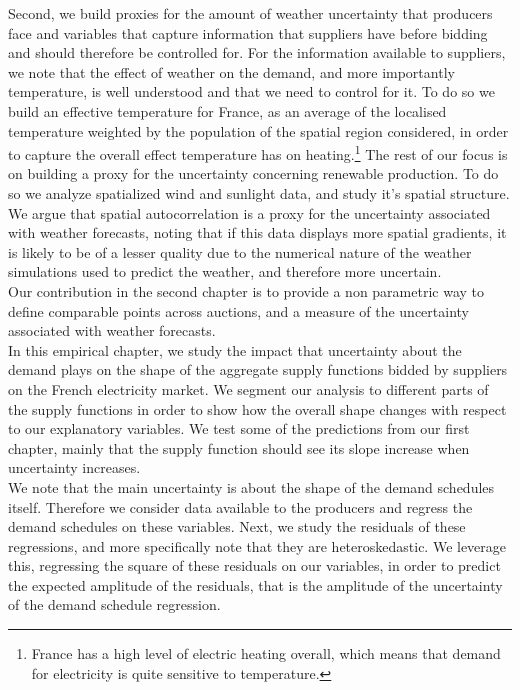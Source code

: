 Second, we build proxies for the amount of weather uncertainty that producers face and variables that capture information that suppliers have before bidding and should therefore be controlled for. For the information available to suppliers, we note that the effect of weather on the demand, and more importantly temperature, is well understood and that we need to control for it. To do so we build an effective temperature for France, as an average of the localised temperature weighted by the population of the spatial region considered, in order to capture the overall effect temperature has on heating.\footnote{France has a high level of electric heating overall, which means that demand for electricity is quite sensitive to temperature.} The rest of our focus is on building a proxy for the uncertainty concerning renewable production. To do so we analyze spatialized wind and sunlight data, and study it's spatial structure. We argue that spatial autocorrelation is a proxy for the uncertainty associated with weather forecasts, noting that if this data displays more spatial gradients, it is likely to be of a lesser quality due to the numerical nature of the weather simulations used to predict the weather, and therefore more uncertain.\\

Our contribution in the second chapter is to provide a non parametric way to define comparable points across auctions, and a measure of the uncertainty associated with weather forecasts.\\

In this empirical chapter, we study the impact that uncertainty about the demand plays on the shape of the aggregate supply functions bidded by suppliers on the French electricity market. We segment our analysis to different parts of the supply functions in order to show how the overall shape changes with respect to our explanatory variables. We test some of the predictions from our first chapter, mainly that the supply function should see its slope increase when uncertainty increases. \\

We note that the main uncertainty is about the shape of the demand schedules itself. Therefore we consider data available to the producers and regress the demand schedules on these variables. Next, we study the residuals of these regressions, and more specifically note that they are heteroskedastic. We leverage this, regressing the square of these residuals on our variables, in order to predict the expected amplitude of the residuals, that is the amplitude of the uncertainty of the demand schedule regression.\\

